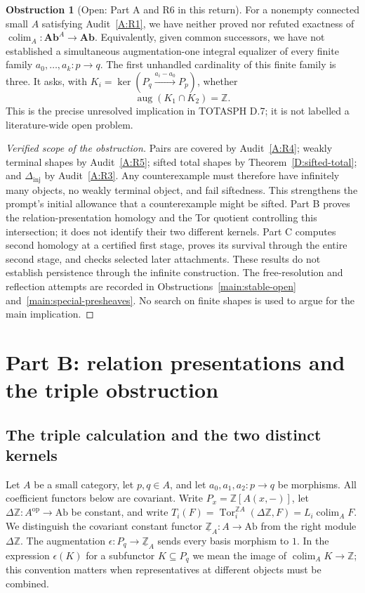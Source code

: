 \documentclass[11pt,a4paper]{article}
\newcommand{\Ab}{\mathbf{Ab}}
\newcommand{\Z}{\mathbb Z}
\newcommand{\colim}{\operatorname*{colim}}
\newcommand{\aug}{\operatorname{aug}}
\newcommand{\Dinj}{\Delta_{\mathrm{inj}}}
\theoremstyle{definition}
\newtheorem{obstruction}[theorem]{Obstruction}
\begin{document}
\begin{obstruction}[Open: Part A and R6 in this return]\label{A:main-open}
For a nonempty connected small $A$ satisfying Audit~\ref{A:R1}, we have neither proved nor refuted exactness of $\colim_A:\Ab^A\to\Ab$. Equivalently, given common successors, we have not established a simultaneous augmentation-one integral equalizer of every finite family $a_0,\ldots,a_k:p\to q$. The first unhandled cardinality of this finite family is three. It asks, with $K_i=\ker(P_q\xrightarrow{a_i-a_0}P_p)$, whether
\[
 \aug(K_1\cap K_2)=\Z.
\]
This is the precise unresolved implication in TOTASPH D.7; it is not labelled a literature-wide open problem.
\end{obstruction}
\begin{proof}[Verified scope of the obstruction]
Pairs are covered by Audit~\ref{A:R4}; weakly terminal shapes by Audit~\ref{A:R5}; sifted total shapes by Theorem~\ref{D:sifted-total}; and $\Dinj$ by Audit~\ref{A:R3}. Any counterexample must therefore have infinitely many objects, no weakly terminal object, and fail siftedness. This strengthens the prompt's initial allowance that a counterexample might be sifted. Part B proves the relation-presentation homology and the Tor quotient controlling this intersection; it does not identify their two different kernels. Part C computes second homology at a certified first stage, proves its survival through the entire second stage, and checks selected later attachments. These results do not establish persistence through the infinite construction. The free-resolution and reflection attempts are recorded in Obstructions~\ref{main:stable-open} and~\ref{main:special-presheaves}. No search on finite shapes is used to argue for the main implication.
\end{proof}
\section{Part B: relation presentations and the triple obstruction}\label{sec:B}
\subsection{The triple calculation and the two distinct kernels}
Let $A$ be a small category, let $p,q\in A$, and let
$a_0,a_1,a_2:p\to q$ be morphisms.  All coefficient functors below are
covariant.  Write $P_x=\mathbb Z[A(x,-)]$, let
$\Delta\mathbb Z:A^{\mathrm{op}}\to\mathrm{Ab}$ be constant, and write
$T_i(F)=\operatorname{Tor}^{\mathbb ZA}_i(\Delta\mathbb Z,F)
=L_i\operatorname{colim}_A F$.
We distinguish the covariant constant functor $\underline{\mathbb Z}_A:A\to\mathrm{Ab}$ from the right module $\Delta\mathbb Z$. The augmentation $\epsilon:P_q\to\underline{\mathbb Z}_A$ sends every basis morphism to $1$.  In the expression $\epsilon(K)$ for a subfunctor
$K\subseteq P_q$ we mean the image of
$\operatorname{colim}_A K\to\mathbb Z$; this convention matters when
representatives at different objects must be combined.
\end{document}
